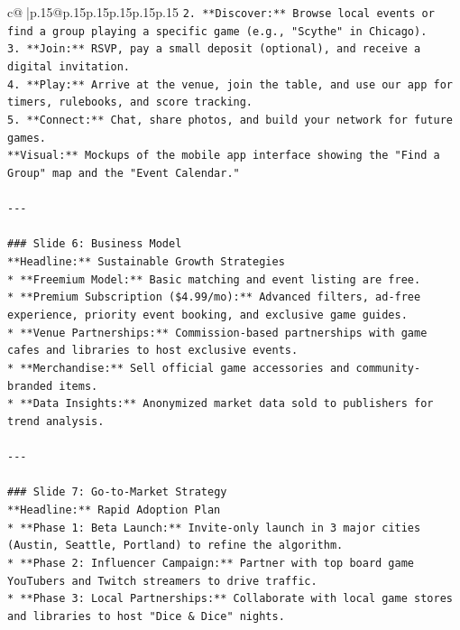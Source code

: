 \documentclass{article}
\begin{document}
{\begin{supertabular}{c@{$\;$}|p{.15\linewidth}@{}p{.15\linewidth}p{.15\linewidth}p{.15\linewidth}p{.15\linewidth}p{.15\linewidth}}
{{{\texttt{2.  **Discover:** Browse local events or find a group playing a specific game (e.g., "Scythe" in Chicago).} \\
\texttt{3.  **Join:** RSVP, pay a small deposit (optional), and receive a digital invitation.} \\
\texttt{4.  **Play:** Arrive at the venue, join the table, and use our app for timers, rulebooks, and score tracking.} \\
\texttt{5.  **Connect:** Chat, share photos, and build your network for future games.} \\
\texttt{**Visual:** Mockups of the mobile app interface showing the "Find a Group" map and the "Event Calendar."} \\
\\ 
\texttt{{-}{-}{-}} \\
\\ 
\texttt{\#\#\# Slide 6: Business Model} \\
\texttt{**Headline:** Sustainable Growth Strategies} \\
\texttt{*   **Freemium Model:** Basic matching and event listing are free.} \\
\texttt{*   **Premium Subscription (\$4.99/mo):** Advanced filters, ad{-}free experience, priority event booking, and exclusive game guides.} \\
\texttt{*   **Venue Partnerships:** Commission{-}based partnerships with game cafes and libraries to host exclusive events.} \\
\texttt{*   **Merchandise:** Sell official game accessories and community{-}branded items.} \\
\texttt{*   **Data Insights:** Anonymized market data sold to publishers for trend analysis.} \\
\\ 
\texttt{{-}{-}{-}} \\
\\ 
\texttt{\#\#\# Slide 7: Go{-}to{-}Market Strategy} \\
\texttt{**Headline:** Rapid Adoption Plan} \\
\texttt{*   **Phase 1: Beta Launch:** Invite{-}only launch in 3 major cities (Austin, Seattle, Portland) to refine the algorithm.} \\
\texttt{*   **Phase 2: Influencer Campaign:** Partner with top board game YouTubers and Twitch streamers to drive traffic.} \\
\texttt{*   **Phase 3: Local Partnerships:** Collaborate with local game stores and libraries to host "Dice \& Dice" nights.} \\
}}}
\end{supertabular}}
\end{document}
